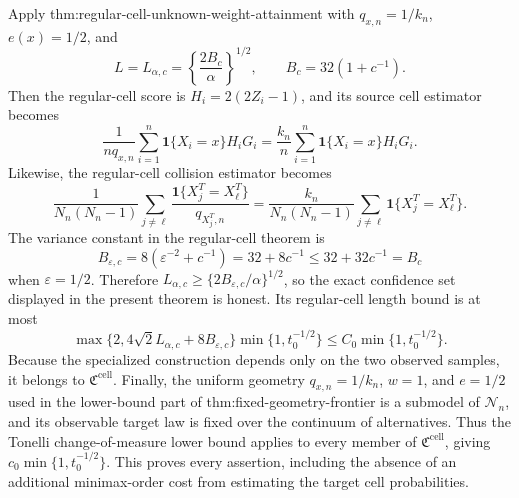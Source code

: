 Apply thm:regular-cell-unknown-weight-attainment with \(q_{x,n}=1/k_n\), \(e(x)=1/2\), and
\[
 L=L_{\alpha,c}=\left\{\frac{2B_c}{\alpha}\right\}^{1/2},
 \qquad B_c=32(1+c^{-1}).
\]
Then the regular-cell score is \(H_i=2(2Z_i-1)\), and its source cell estimator becomes
\[
 \frac{1}{nq_{x,n}}\sum_{i=1}^n\mathbf 1\{X_i=x\}H_iG_i
 =\frac{k_n}{n}\sum_{i=1}^n\mathbf 1\{X_i=x\}H_iG_i.
\]
Likewise, the regular-cell collision estimator becomes
\[
 \frac{1}{N_n(N_n-1)}\sum_{j\ne\ell}
 \frac{\mathbf 1\{X_j^T=X_\ell^T\}}{q_{X_j^T,n}}
 =\frac{k_n}{N_n(N_n-1)}\sum_{j\ne\ell}
 \mathbf 1\{X_j^T=X_\ell^T\}.
\]
The variance constant in the regular-cell theorem is
\[
 B_{\varepsilon,c}=8(\varepsilon^{-2}+c^{-1})
 =32+8c^{-1}\le32+32c^{-1}=B_c
\]
when \(\varepsilon=1/2\).  Therefore \(L_{\alpha,c}\ge\{2B_{\varepsilon,c}/\alpha\}^{1/2}\), so the exact confidence set displayed in the present theorem is honest.  Its regular-cell length bound is at most
\[
 \max\{2,4\sqrt2L_{\alpha,c}+8B_{\varepsilon,c}\}
 \min\{1,t_0^{-1/2}\}
 \le C_0\min\{1,t_0^{-1/2}\}.
\]
Because the specialized construction depends only on the two observed samples, it belongs to \(\mathfrak C^{\mathrm{cell}}\).  Finally, the uniform geometry \(q_{x,n}=1/k_n\), \(w=1\), and \(e=1/2\) used in the lower-bound part of thm:fixed-geometry-frontier is a submodel of \(\mathcal N_n\), and its observable target law is fixed over the continuum of alternatives.  Thus the Tonelli change-of-measure lower bound applies to every member of \(\mathfrak C^{\mathrm{cell}}\), giving \(c_0\min\{1,t_0^{-1/2}\}\).  This proves every assertion, including the absence of an additional minimax-order cost from estimating the target cell probabilities.